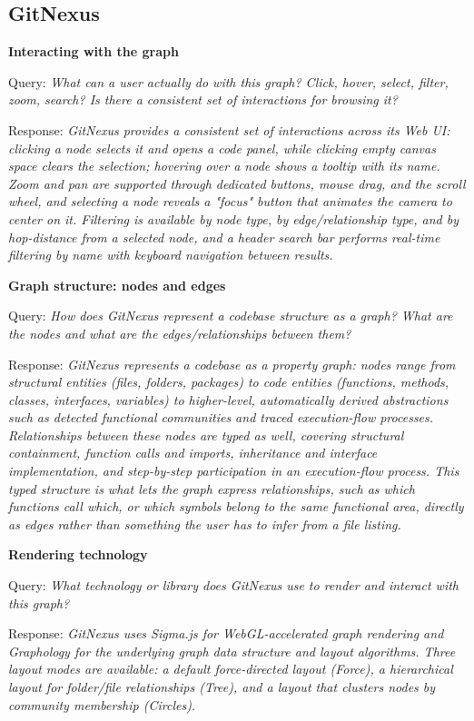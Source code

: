 \subsection{GitNexus}\label{app:1-gitnexus}

\textbf{Interacting with the graph}

Query: \textit{What can a user actually do with this graph? Click, hover, select, filter, zoom, search? Is there a consistent set of interactions for browsing it?}

Response: \textit{GitNexus provides a consistent set of interactions across its Web UI: clicking a node selects it and opens a code panel, while clicking empty canvas space clears the selection; hovering over a node shows a tooltip with its name. Zoom and pan are supported through dedicated buttons, mouse drag, and the scroll wheel, and selecting a node reveals a "focus" button that animates the camera to center on it. Filtering is available by node type, by edge/relationship type, and by hop-distance from a selected node, and a header search bar performs real-time filtering by name with keyboard navigation between results.}

\textbf{Graph structure: nodes and edges}

Query: \textit{How does GitNexus represent a codebase structure as a graph? What are the nodes and what are the edges/relationships between them?}

Response: \textit{GitNexus represents a codebase as a property graph: nodes range from structural entities (files, folders, packages) to code entities (functions, methods, classes, interfaces, variables) to higher-level, automatically derived abstractions such as detected functional communities and traced execution-flow processes. Relationships between these nodes are typed as well, covering structural containment, function calls and imports, inheritance and interface implementation, and step-by-step participation in an execution-flow process. This typed structure is what lets the graph express relationships, such as which functions call which, or which symbols belong to the same functional area, directly as edges rather than something the user has to infer from a file listing.}

\textbf{Rendering technology}

Query: \textit{What technology or library does GitNexus use to render and interact with this graph?}

Response: \textit{GitNexus uses Sigma.js for WebGL-accelerated graph rendering and Graphology for the underlying graph data structure and layout algorithms. Three layout modes are available: a default force-directed layout (Force), a hierarchical layout for folder/file relationships (Tree), and a layout that clusters nodes by community membership (Circles).}


